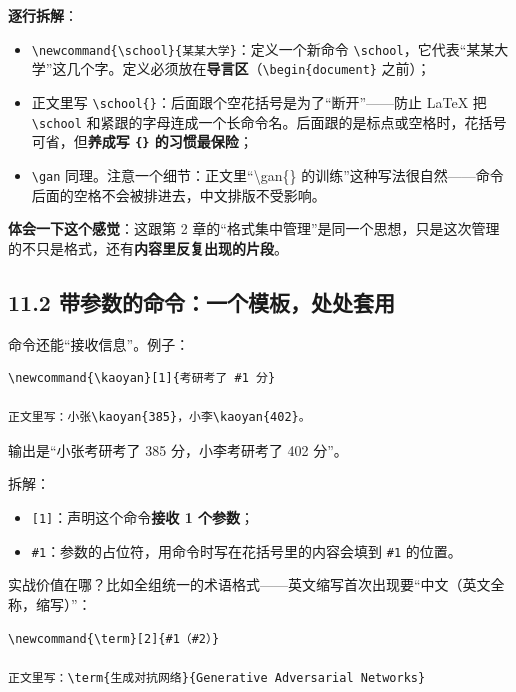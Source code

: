 \textbf{逐行拆解}：

\begin{itemize}
\setlength{\itemsep}{2pt}
\item \texttt{\textbackslash{}newcommand\{\textbackslash{}school\}\{某某大学\}}：定义一个新命令 \texttt{\textbackslash{}school}，它代表“某某大学”这几个字。定义必须放在\textbf{导言区}（\texttt{\textbackslash{}begin\{document\}} 之前）；
\item 正文里写 \texttt{\textbackslash{}school\{\}}：后面跟个空花括号是为了“断开”——防止 LaTeX 把 \texttt{\textbackslash{}school} 和紧跟的字母连成一个长命令名。后面跟的是标点或空格时，花括号可省，但\textbf{养成写 \texttt{\{\}} 的习惯最保险}；
\item \texttt{\textbackslash{}gan} 同理。注意一个细节：正文里“\textbackslash{}gan\{\} 的训练”这种写法很自然——命令后面的空格不会被排进去，中文排版不受影响。
\end{itemize}

\textbf{体会一下这个感觉}：这跟第 2 章的“格式集中管理”是同一个思想，只是这次管理的不只是格式，还有\textbf{内容里反复出现的片段}。

\subsection*{11.2 带参数的命令：一个模板，处处套用}

命令还能“接收信息”。例子：

\begin{lstlisting}
\newcommand{\kaoyan}[1]{考研考了 #1 分}

正文里写：小张\kaoyan{385}，小李\kaoyan{402}。
\end{lstlisting}

输出是“小张考研考了 385 分，小李考研考了 402 分”。

拆解：

\begin{itemize}
\setlength{\itemsep}{2pt}
\item \texttt{[1]}：声明这个命令\textbf{接收 1 个参数}；
\item \texttt{\#1}：参数的占位符，用命令时写在花括号里的内容会填到 \texttt{\#1} 的位置。
\end{itemize}

实战价值在哪？比如全组统一的术语格式——英文缩写首次出现要“中文（英文全称，缩写）”：

\begin{lstlisting}
\newcommand{\term}[2]{#1（#2）}

正文里写：\term{生成对抗网络}{Generative Adversarial Networks}
\end{lstlisting}

